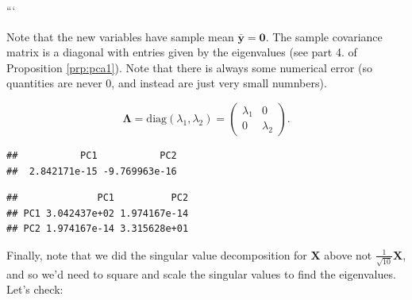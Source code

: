 \documentclass[]{book}
\newenvironment{Shaded}{\begin{snugshade}}{\end{snugshade}}
\newcommand{\CommentTok}[1]{\textcolor[rgb]{0.56,0.35,0.01}{\textit{#1}}}
\newcommand{\DecValTok}[1]{\textcolor[rgb]{0.00,0.00,0.81}{#1}}
\newcommand{\KeywordTok}[1]{\textcolor[rgb]{0.13,0.29,0.53}{\textbf{#1}}}
\newcommand{\NormalTok}[1]{#1}
\newcommand{\OperatorTok}[1]{\textcolor[rgb]{0.81,0.36,0.00}{\textbf{#1}}}
\theoremstyle{definition}
\theoremstyle{definition}
\theoremstyle{definition}
\theoremstyle{remark}
\begin{document}
```

Note that the new variables have sample mean \(\bar{\boldsymbol y}=\boldsymbol 0\). The sample covariance matrix is a diagonal with entries given by the eigenvalues (see part 4. of Proposition \ref{prp:pca1}). Note that there is always some numerical error (so quantities are never 0, and instead are just very small numnbers).

\[
\boldsymbol \Lambda= \text{diag}(\lambda_1,\lambda_2) =  \begin{pmatrix} \lambda_1 & 0 \\ 0 & \lambda_2 \end{pmatrix}.
\]

\begin{Shaded}
\end{Shaded}

\begin{verbatim}
##           PC1           PC2 
##  2.842171e-15 -9.769963e-16
\end{verbatim}

\begin{Shaded}
\end{Shaded}

\begin{verbatim}
##              PC1          PC2
## PC1 3.042437e+02 1.974167e-14
## PC2 1.974167e-14 3.315628e+01
\end{verbatim}

Finally, note that we did the singular value decomposition for \(\boldsymbol X\) above not \(\frac{1}{\sqrt{10}}\boldsymbol X\), and so we'd need to square and scale the singular values to find the eigenvalues. Let's check:

\begin{Shaded}
\end{Shaded}
\end{document}
